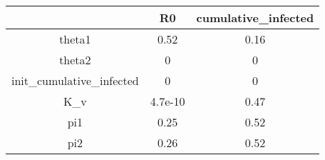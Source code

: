 \begin{tabular}{|c|c|c|}
\hline
& R0 & cumulative_infected \\
\hline
theta1 & 0.52 & 0.16 \\
\hline
theta2 & 0 & 0 \\
\hline
init_cumulative_infected & 0 & 0 \\
\hline
K_v & 4.7e-10 & 0.47 \\
\hline
pi1 & 0.25 & 0.52 \\
\hline
pi2 & 0.26 & 0.52 \\
\hline
\end{tabular}
